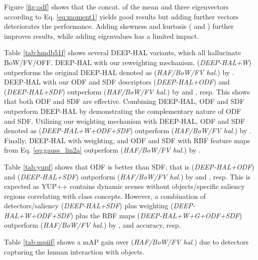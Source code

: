 \vspace{0.05cm}
 Figure \ref{fig:odf} shows that the concat. of the mean and three eigenvectors according to Eq. \eqref{eq:moment1} yields good results but adding further vectors deteriorates the performance. Adding skewness and kurtosis ( and ) further improves results, while adding eigenvalues has a limited impact. 

\vspace{0.05cm}
 Table \ref{tab:hmdb51f} shows several  DEEP-HAL variants, which all hallucinate BoW/FV/OFF. DEEP-HAL with  our reweighting mechanism.  ({\em DEEP-HAL+W}) outperforms the original DEEP-HAL denoted as ({\em HAF/BoW/FV hal.}) \cite{Wang_2019_ICCV} by . DEEP-HAL with our ODF and SDF descriptors  ({\em DEEP-HAL+ODF}) and ({\em DEEP-HAL+SDF}) outperform ({\em HAF/BoW/FV hal.}) by  and , resp. This shows that both ODF and SDF are effective. Combining DEEP-HAL, ODF and SDF  outperform DEEP-HAL by  demonstrating the complementary nature of ODF and SDF. Utilizing our weighting mechanism with  DEEP-HAL, ODF and SDF denoted as ({\em DEEP-HAL+W+ODF+SDF})  outperform ({\em HAF/BoW/FV hal.}) by . Finally, DEEP-HAL with weighting, and ODF and SDF with RBF feature maps from Eq. \eqref{eq:gauss_lin2a} outperform ({\em HAF/BoW/FV hal.}) by .

\vspace{0.05cm}
 Table \ref{tab:yupf} shows that ODF is better than SDF, that is ({\em DEEP-HAL+ODF}) and ({\em DEEP-HAL+SDF}) outperform ({\em HAF/BoW/FV hal.}) by  and , resp. This is expected as YUP++ contains dynamic scenes without objects/specific saliency regions correlating with class concepts. However, a combination of detectors/saliency ({\em DEEP-HAL+SDF}) plus weighting ({\em DEEP-HAL+W+ODF+SDF}) plus the RBF  maps ({\em DEEP-HAL+W+G+ODF+SDF}) outperform ({\em HAF/BoW/FV hal.}) by ,  and  accuracy, resp.

\vspace{0.05cm}
 Table \ref{tab:mpiif} shows a  mAP gain over ({\em HAF/BoW/FV hal.}) due to detectors capturing the human interaction with objects. 



